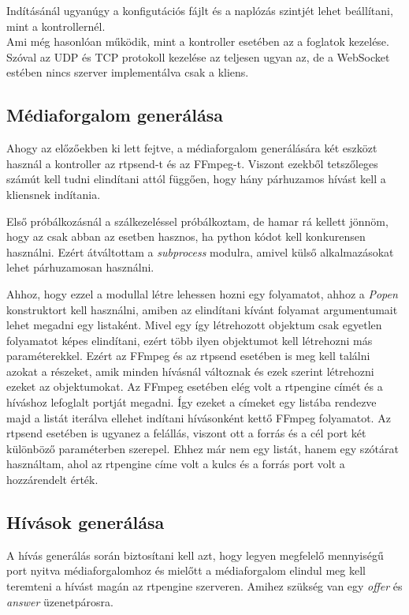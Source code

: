 Indításánál ugyanúgy a konfigutációs fájlt és a naplózás szintjét lehet beállítani,
mint a kontrollernél. \\

Ami még hasonlóan működik, mint a kontroller esetében az a foglatok kezelése.
Szóval az UDP és TCP protokoll kezelése az teljesen ugyan az, de a WebSocket estében
nincs szerver implementálva csak a kliens. 

\subsection{Médiaforgalom generálása}

Ahogy az előzőekben ki lett fejtve, a médiaforgalom generálására két eszközt 
használ a kontroller az rtpsend-t és az FFmpeg-t. Viszont ezekből tetszőleges
számút kell tudni elindítani attól függően, hogy hány párhuzamos hívást kell 
a kliensnek indítania.

Első próbálkozásnál a szálkezeléssel próbálkoztam, de hamar rá kellett jönnöm,
hogy az csak abban az esetben hasznos, ha python kódot kell konkurensen 
használni. Ezért átváltottam a \textit{subprocess} \cite{subprocess} modulra, amivel külső alkalmazásokat
lehet párhuzamosan használni.

Ahhoz, hogy ezzel a modullal létre lehessen hozni egy folyamatot, ahhoz a \textit{Popen}
konstruktort kell használni, amiben az elindítani kívánt folyamat argumentumait lehet
megadni egy listaként. Mivel egy így létrehozott objektum csak egyetlen folyamatot 
képes elindítani, ezért több ilyen objektumot kell létrehozni más paraméterekkel. Ezért
az FFmpeg és az rtpsend esetében is meg kell találni azokat a részeket, amik minden 
hívásnál változnak és ezek szerint létrehozni ezeket az objektumokat. Az FFmpeg esetében
elég volt a rtpengine címét és a híváshoz lefoglalt portját megadni. Így ezeket a címeket
egy listába rendezve majd a listát iterálva ellehet indítani hívásonként kettő
FFmpeg folyamatot. Az rtpsend esetében is ugyanez a felállás, viszont ott a forrás és 
a cél port két különböző paraméterben szerepel. Ehhez már nem egy listát, hanem egy 
szótárat használtam, ahol az rtpengine címe volt a kulcs és a forrás port volt a hozzárendelt
érték.

\subsection{Hívások generálása}

A hívás generálás során biztosítani kell azt, hogy legyen megfelelő mennyiségű port
nyitva médiaforgalomhoz és mielőtt a médiaforgalom elindul meg kell teremteni a hívást
magán az rtpengine szerveren. Amihez szükség van egy \textit{offer} és \textit{answer}
üzenetpárosra.

